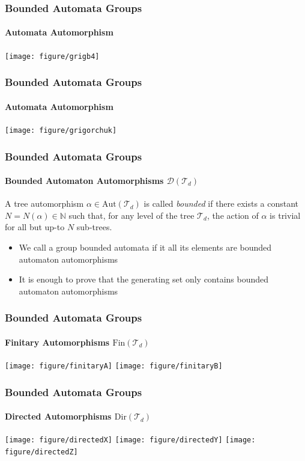 \documentclass[11pt]{beamer}
\begin{document}
\begin{frame}
\frametitle{Bounded Automata Groups}
\framesubtitle{\large Automata Automorphism}
\hspace{2em}\texttt{[image: figure/grigb4]}
\end{frame}

\begin{frame}
\frametitle{Bounded Automata Groups}
\framesubtitle{\large Automata Automorphism}
\hspace{2em}\texttt{[image: figure/grigorchuk]}
\end{frame}

\begin{frame}
\frametitle{Bounded Automata Groups}
\framesubtitle{\large Bounded Automaton Automorphisms $\mathcal{D}(\mathcal{T}_d)$}
\begin{definition}
A tree automorphism $\alpha \in \mathrm{Aut}(\mathcal{T}_d)$ is called \emph{bounded} if there exists a constant $N = N(\alpha) \in \mathbb{N}$ such that, for any level of the tree $\mathcal{T}_d$, the action of $\alpha$ is trivial for all but up-to $N$ sub-trees.
\end{definition}

\begin{itemize}
	\item<2-> We call a group bounded automata if it all its elements are bounded automaton automorphisms
	
	\item<3-> It is enough to prove that the generating set only contains bounded automaton automorphisms
\end{itemize}

\end{frame}

\begin{frame}
\frametitle{Bounded Automata Groups}
\framesubtitle{\large Finitary Automorphisms $\mathrm{Fin}(\mathcal{T}_d)$}

\texttt{[image: figure/finitaryA]}
\hfill
\texttt{[image: figure/finitaryB]}

\end{frame}


\begin{frame}
\frametitle{Bounded Automata Groups}
\framesubtitle{\large Directed Automorphisms $\mathrm{Dir}(\mathcal{T}_d)$}

\centering

\texttt{[image: figure/directedX]}
\hspace*{-3em}
\texttt{[image: figure/directedY]}
\texttt{[image: figure/directedZ]}

\end{frame}
\end{document}
